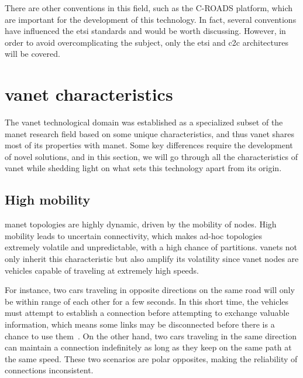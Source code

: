 There are other conventions in this field, such as the C-ROADS platform\cite{noauthor_platform_nodate}, which are important for the development of this technology. In fact, several conventions have influenced the \gls{etsi} standards and would be worth discussing. However, in order to avoid overcomplicating the subject, only the \gls{etsi} and \gls{c2c} architectures will be covered.




\section[VANET characteristics]{\gls{vanet} characteristics}
\label{sec:VANET_characteristics}

The \gls{vanet} technological domain was established as a specialized subset of the \gls{manet} research field based on some unique characteristics, and thus \gls{vanet} shares most of its properties with \gls{manet}. Some key differences require the development of novel solutions, and in this section, we will go through all the characteristics of \gls{vanet} while shedding light on what sets this technology apart from its origin.

\subsection{High mobility}
\label{subsec:high_mob}

\gls{manet} topologies are highly dynamic, driven by the mobility of nodes. High mobility leads to uncertain connectivity, which makes ad-hoc topologies extremely volatile and unpredictable, with a high chance of partitions\cite{toor_vehicle_2008}. \glspl{vanet} not only inherit this characteristic but also amplify its volatility since \gls{vanet} nodes are vehicles capable of traveling at extremely high speeds. 

For instance, two cars traveling in opposite directions on the same road will only be within range of each other for a few seconds. In this short time, the vehicles must attempt to establish a connection before attempting to exchange valuable information, which means some links may be disconnected before there is a chance to use them~\cite{liang_vehicular_2015}. On the other hand, two cars traveling in the same direction can maintain a connection indefinitely as long as they keep on the same path at the same speed. These two scenarios are polar opposites, making the reliability of connections inconsistent.


